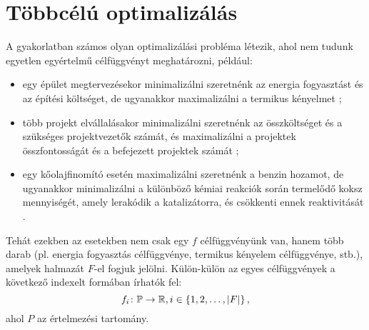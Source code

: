 \section{Többcélú optimalizálás}
A gyakorlatban számos olyan optimalizálási probléma létezik, ahol nem tudunk egyetlen egyértelmű célfüggvényt meghatározni, például:
\begin{itemize}
  \item[\textbullet] egy épület megtervezésekor minimalizálni szeretnénk az energia fogyasztást és az építési költséget, de ugyanakkor maximalizálni a termikus kényelmet \cite{nguyen2014review};
  \item[\textbullet] több projekt elvállalásakor minimalizálni szeretnénk az összköltséget és a szükséges projektvezetők számát, és maximalizálni a projektek összfontosságát és a befejezett projektek számát \cite{alothaimeen2019overview};
  \item[\textbullet] egy kőolajfinomító esetén maximalizálni szeretnénk a benzin hozamot, de ugyanakkor minimalizálni a különböző kémiai reakciók során termelődő koksz mennyiségét, amely lerakódik a katalizátorra, és csökkenti ennek reaktivitását \cite{kasat2003multi}.
\end{itemize}

Tehát ezekben az esetekben nem csak egy $f$ célfüggvényünk van, hanem több darab (pl. energia fogyasztás célfüggvénye, termikus kényelem célfüggvénye, stb.), amelyek halmazát $F$-el fogjuk jelölni.
Külön-külön az egyes célfüggvények a következő indexelt formában írhatók fel:
\begin{equation}\label{eqn:OBJECTIVE_FUNCTIONS}
  f_i \colon \mathbb{P} \to \mathbb{R}, i \in \left\{ 1, 2, \dots, \lvert F\rvert \right\},
\end{equation}
ahol $P$ az értelmezési tartomány.
